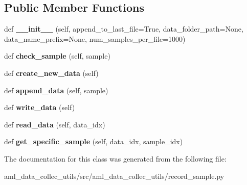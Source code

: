\subsection*{Public Member Functions}
\begin{DoxyCompactItemize}
\item 
\hypertarget{classaml__data__collec__utils_1_1record__sample_1_1_data_manager_ae9caae57725fd3650cd5d7c13007f506}{}\label{classaml__data__collec__utils_1_1record__sample_1_1_data_manager_ae9caae57725fd3650cd5d7c13007f506} 
def {\bfseries \+\_\+\+\_\+init\+\_\+\+\_\+} (self, append\+\_\+to\+\_\+last\+\_\+file=True, data\+\_\+folder\+\_\+path=None, data\+\_\+name\+\_\+prefix=None, num\+\_\+samples\+\_\+per\+\_\+file=1000)
\item 
\hypertarget{classaml__data__collec__utils_1_1record__sample_1_1_data_manager_a68db3eff9f36db39e9a48aa7c734e4d5}{}\label{classaml__data__collec__utils_1_1record__sample_1_1_data_manager_a68db3eff9f36db39e9a48aa7c734e4d5} 
def {\bfseries check\+\_\+sample} (self, sample)
\item 
\hypertarget{classaml__data__collec__utils_1_1record__sample_1_1_data_manager_a2965a015f0d4a3cf7977b3b39ba4bb3a}{}\label{classaml__data__collec__utils_1_1record__sample_1_1_data_manager_a2965a015f0d4a3cf7977b3b39ba4bb3a} 
def {\bfseries create\+\_\+new\+\_\+data} (self)
\item 
\hypertarget{classaml__data__collec__utils_1_1record__sample_1_1_data_manager_a5957e4324c84993c444b88d0ad41e1bd}{}\label{classaml__data__collec__utils_1_1record__sample_1_1_data_manager_a5957e4324c84993c444b88d0ad41e1bd} 
def {\bfseries append\+\_\+data} (self, sample)
\item 
\hypertarget{classaml__data__collec__utils_1_1record__sample_1_1_data_manager_a62cffdb9192c0cbfa3585f298ebc8641}{}\label{classaml__data__collec__utils_1_1record__sample_1_1_data_manager_a62cffdb9192c0cbfa3585f298ebc8641} 
def {\bfseries write\+\_\+data} (self)
\item 
\hypertarget{classaml__data__collec__utils_1_1record__sample_1_1_data_manager_a3cf995c6dc6ea5f2fd95ef79a3b1a69a}{}\label{classaml__data__collec__utils_1_1record__sample_1_1_data_manager_a3cf995c6dc6ea5f2fd95ef79a3b1a69a} 
def {\bfseries read\+\_\+data} (self, data\+\_\+idx)
\item 
\hypertarget{classaml__data__collec__utils_1_1record__sample_1_1_data_manager_a10f77ee341409765a8489ead6667ad9a}{}\label{classaml__data__collec__utils_1_1record__sample_1_1_data_manager_a10f77ee341409765a8489ead6667ad9a} 
def {\bfseries get\+\_\+specific\+\_\+sample} (self, data\+\_\+idx, sample\+\_\+idx)
\end{DoxyCompactItemize}


The documentation for this class was generated from the following file\+:\begin{DoxyCompactItemize}
\item 
aml\+\_\+data\+\_\+collec\+\_\+utils/src/aml\+\_\+data\+\_\+collec\+\_\+utils/record\+\_\+sample.\+py\end{DoxyCompactItemize}
